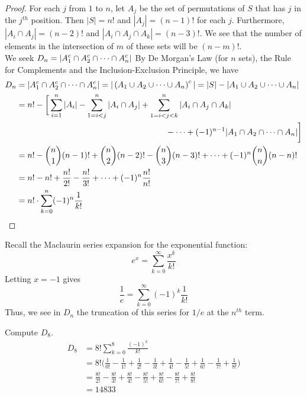 \documentclass[handout]{ximera}
\begin{document}
\begin{proof}
For each $j$ from $1$ to $n$, let $A_j$ be the set of permutations of $S$ that has $j$ in the $j^{th}$ position.
Then $|S| = n!$ and $|A_j| = (n-1)!$ for each $j$. Furthermore, $|A_i \cap A_j| = (n-2)!$ and $|A_i \cap A_j \cap A_k| = (n-3)!$.
We see that the number of elements in the intersection of $m$ of these sets will be $(n-m)!$.\\
We seek $\displaystyle D_n = |A_1^c \cap A_2^c \cap \cdots \cap A_n^c|$
By De Morgan's Law (for $n$ sets), the Rule for Complements and the Inclusion-Exclusion Principle, we have
\begin{align*}
D_n &= |A_1^c \cap A_2^c \cap \cdots \cap A_n^c| = |\left(A_1 \cup A_2 \cup \cdots \cup A_n\right)^c|
   = |S| - |A_1 \cup A_2 \cup \cdots \cup A_n|\\
   &= n! - \bigg[\sum_{i =1}^n |A_i| - \sum_{1 =i<j}^n |A_i\cap A_j|+ 
   \sum_{1 =i<j< k}^n |A_i\cap A_j \cap A_k| \\
   &\hspace{2.5 in} - \cdots + (-1)^{n-1} |A_1 \cap A_2 \cap \cdots \cap A_n|\bigg]\\
   &= n! - \binom{n}{1}(n-1)! + \binom{n}{2}(n-2)! - \binom{n}{3}(n-3)! + \cdots + (-1)^n \binom{n}{n}(n-n)!\\
   &= n! - n! + \frac{n!}{2!} - \frac{n!}{3!} + \cdots + (-1)^n \frac{n!}{n!}\\
   &= n! \cdot \sum_{k=0}^n (-1)^n \frac{1}{k!}
\end{align*}


\end{proof}


\begin{remark}
Recall the Maclaurin series expansion for the exponential function:
\[
e^x = \sum_{k = 0}^\infty \frac{x^k}{k!}
\]
Letting $x = -1$ gives
\[
\frac{1}{e} = \sum_{k = 0}^\infty (-1)^k\frac{1}{k!}
\]
Thus, we see in $D_n$ the truncation of this series for $1/e$ at the $n^{th}$ term.
\end{remark}


\begin{example}[example 2]
Compute $D_8$.\\
\begin{align*}
D_8 &= 8! \sum_{k=0}^8 \frac{(-1)^k}{k!}\\
&= 8!\bigg(\frac{1}{0!} - \frac{1}{1!} + \frac{1}{2!} - \frac{1}{3!} + \frac{1}{4!}- \frac{1}{5!} + \frac{1}{6!} - \frac{1}{7!} + \frac{1}{8!}\bigg) \\
&=  \frac{8!}{2!} - \frac{8!}{3!} + \frac{8!}{4!} - \frac{8!}{5!} + \frac{8!}{6!} - \frac{8!}{7!} + \frac{8!}{8!} \\
&= 14833
\end{align*}
\end{example}
\end{document}
